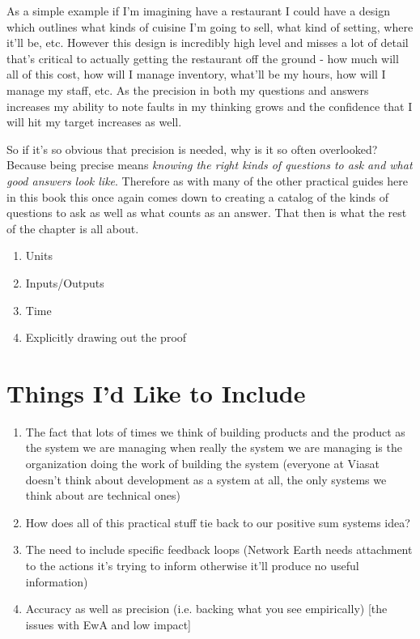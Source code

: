 \documentclass[11pt,a5paper]{book}
\begin{document}
As a simple example if I'm imagining have a restaurant I could have a design which outlines what kinds of cuisine I'm going to sell, what kind of setting, where it'll be, etc. However this design is incredibly high level and misses a lot of detail that's critical to actually getting the restaurant off the ground - how much will all of this cost, how will I manage inventory, what'll be my hours, how will I manage my staff, etc. As the precision in both my questions and answers increases my ability to note faults in my thinking grows and the confidence that I will hit my target increases as well.
\newline

So if it's so obvious that precision is needed, why is it so often overlooked? Because being precise means \textit{knowing the right kinds of questions to ask and what good answers look like}. Therefore as with many of the other practical guides here in this book this once again comes down to creating a catalog of the kinds of questions to ask as well as what counts as an answer. That then is what the rest of the chapter is all about.

\begin{enumerate}
\item Units
\item Inputs/Outputs
\item Time
\item Explicitly drawing out the proof
\end{enumerate}

\chapter{Things I'd Like to Include}
\begin{enumerate}
\item The fact that lots of times we think of building products and the product as the system we are managing when really the system we are managing is the organization doing the work of building the system (everyone at Viasat doesn't think about development as a system at all, the only systems we think about are technical ones)
\item How does all of this practical stuff tie back to our positive sum systems idea?
\item The need to include specific feedback loops (Network Earth needs attachment to the actions it's trying to inform otherwise it'll produce no useful information)
\item Accuracy as well as precision (i.e. backing what you see empirically) [the issues with EwA and low impact]
\end{enumerate}



\end{document}
